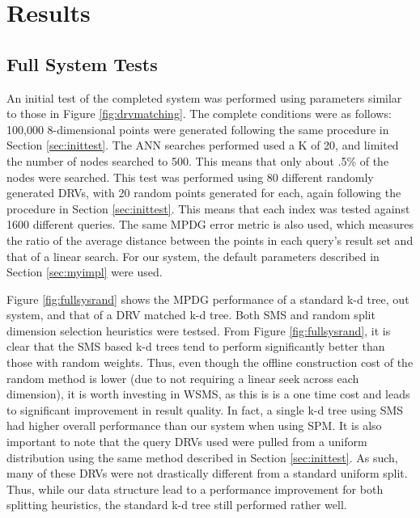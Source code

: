 \chapter{Results} %

\label{results} %


\section{Full System Tests}
\label{sec:fullsystest}

An initial test of the completed system was performed using parameters similar to those in Figure \ref{fig:drvmatching}.  The complete conditions were as follows: 100,000 8-dimensional points were generated following the same procedure in Section \ref{sec:inittest}.  The ANN searches performed used a K of 20, and limited the number of nodes searched to 500.  This means that only about .5\% of the nodes were searched.  This test was performed using 80 different randomly generated DRVs, with 20 random points generated for each, again following the procedure in Section \ref{sec:inittest}.  This means that each index was tested against 1600 different queries.  The same MPDG error metric is also used, which measures the ratio of the average distance between the points in each query's result set and that of a linear search.  For our system, the default parameters described in Section \ref{sec:myimpl} were used.

Figure \ref{fig:fullsysrand} shows the MPDG performance of a standard k-d tree, out system, and that of a DRV matched k-d tree.  Both SMS and random split dimension selection heuristics were testsed.  From Figure \ref{fig:fullsysrand}, it is clear that the SMS based k-d trees tend to perform significantly better than those with random weights.  Thus, even though the offline construction cost of the random method is lower (due to not requiring a linear seek across each dimension), it is worth investing in WSMS, as this is is a one time cost and leads to significant improvement in result quality.  In fact, a single k-d tree using SMS had higher overall performance than our system when using SPM.  It is also important to note that the query DRVs used were pulled from a uniform distribution using the same method described in Section \ref{sec:inittest}.  As such, many of these DRVs were not drastically different from a standard uniform split.  Thus, while our data structure lead to a performance improvement for both splitting heuristics, the standard k-d tree still performed rather well.

